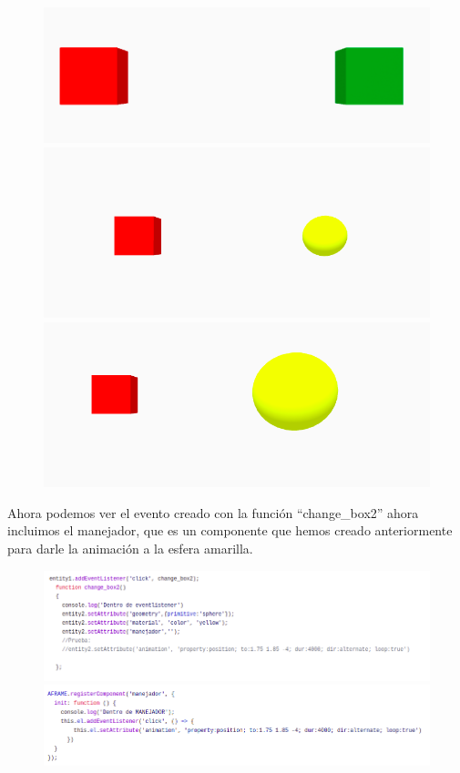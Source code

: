 \documentclass[a4paper, 12pt]{book}
\begin{document}
\begin{figure}[h]
\centering
    \includegraphics[scale=0.5]{img/escena1_2a.png}
    \includegraphics[scale=0.3]{img/escena1_3a.png}
    \includegraphics[scale=0.3]{img/escena1_3b.png}
\end{figure}

Ahora podemos ver el evento creado con la función “change\_box2” ahora incluimos el manejador, que es un componente que hemos creado anteriormente para darle la animación a la esfera amarilla.

\begin{figure}[h]
\centering
 \includegraphics[scale=0.55]{img/code_1-3a.png}
  \includegraphics[scale=0.55]{img/code_1-3b.png}
\end{figure}
\end{document}
